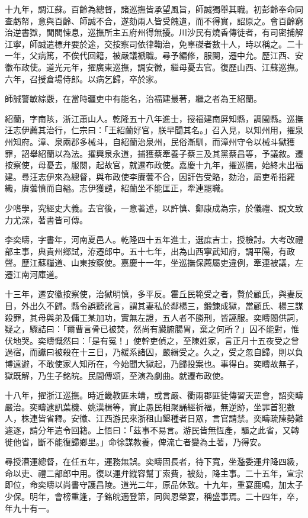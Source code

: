 \begin{pinyinscope}
十九年，調江蘇。百齡為總督，諸巡撫皆承望風旨，師誠獨舉其職。初彭齡奉命同查虧帑，意與百齡、師誠不合，遂劾兩人皆受餽遺，而不得實，詔原之。會百齡窮治逆書獄，閭閻悚息，巡撫所主五府州得無擾。川沙民有燒香傳徒者，有司密捕解江寧，師誠遣標弁要於途，交按察司依律鞫治，免辜磔者數十人，時以稱之。二十一年，父病篤，不俟代回籍，被嚴議褫職。尋予編修，服闋，遷中允。歷江西、安徽布政使。道光元年，擢廣東巡撫，調安徽，繼母憂去官。復歷山西、江蘇巡撫。六年，召授倉場侍郎。以病乞歸，卒於家。

師誠警敏綜覈，在當時疆吏中有能名，治福建最著，繼之者為王紹蘭。

紹蘭，字南陔，浙江蕭山人。乾隆五十八年進士，授福建南屏知縣，調閩縣。巡撫汪志伊薦其治行，仁宗曰：「王紹蘭好官，朕早聞其名。」召入見，以知州用，擢泉州知府。漳、泉兩郡多械斗，自紹蘭治泉州，民俗漸馴，而漳州守令以械斗獄獲罪，詔舉紹蘭以為法。擢興泉永道，捕獲蔡牽養子蔡三及其黨蔡昌等，予議敘。遷按察使，母憂去，服闋，起故官，就遷布政使。嘉慶十九年，擢巡撫，始終未出福建。尋汪志伊來為總督，與布政使李賡蕓不合，因訐告受賂，劾治，屬吏希指羅織，賡蕓憤而自縊。志伊獲譴，紹蘭坐不能匡正，牽連罷職。

少嗜學，究經史大義。去官後，一意著述，以許慎、鄭康成為宗，於儀禮、說文致力尤深，著書皆可傳。

李奕疇，字書年，河南夏邑人。乾隆四十五年進士，選庶吉士，授檢討。大考改禮部主事，典貴州鄉試，洊遷郎中。五十七年，出為山西寧武知府，調平陽，有政聲。歷江蘇糧道、山東按察使。嘉慶十一年，坐巡撫保薦屬吏違例，牽連被議，左遷江南河庫道。

十三年，遷安徽按察使，治獄明慎，多平反。霍丘民範受之者，贅於顧氏，與妻反目，外出久不歸。縣令誤聽訛言，謂其妻私於鄰楊三，鍛鍊成獄，當顧氏、楊三謀殺罪，其母與弟及傭工某加功，實無左證，五人者不勝刑，皆誣服。奕疇閱供詞，疑之，驟詰曰：「爾曹言骨已被焚，然尚有臟腑腸胃，棄之何所？」囚不能對，惟伏地哭。奕疇慨然曰：「是有冤！」使幹吏偵之，至陳姓家，言正月十五夜受之曾過宿，而讞曰被殺在十三日，乃緩系諸囚，嚴緝受之。久之，受之忽自歸，則以負博遠避，不敢使家人知所在，今始聞大獄起，乃歸投案也。事得白。奕疇故無子，獄既解，乃生子銘皖。民間傳頌，至演為劇曲。就遷布政使。

十八年，擢浙江巡撫。時近畿教匪未靖，或言嚴、衢兩郡匪徒傳習天罡會，詔奕疇嚴治。奕疇逮訊葉機、姚漢楫等，實止愚民相聚誦經祈福，無逆跡，坐罪首犯數人，株連皆省釋。安徽、江西游民來浙租山墾種者日眾，言官請禁。奕疇疏陳勢難遽逐，請分年遣令回籍。上悟曰：「茲事不易言。游民皆無恆產，驅之此省，又轉徙他省，斷不能復歸鄉里。」命徐謀教養，俾流亡者變為土著，乃得安。

尋授漕運總督，在任五年，運務無誤。奕疇固長者，待下寬，坐濫委運弁降四級，命以吏、禮二部郎中用。復以運弁縱容幫丁索費，被劾，降主事。二十五年，宣宗即位，命奕疇以尚書守護昌陵。道光二年，原品休致。十九年，重宴鹿鳴，加太子少保。明年，會榜重逢，子銘皖適登第，同與恩榮宴，稱盛事焉。二十四年，卒，年九十有一。


\end{pinyinscope}
